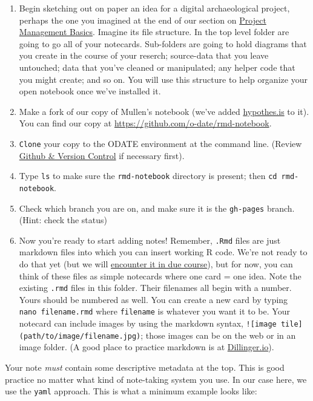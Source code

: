 \documentclass[english,]{book}
\begin{document}
\begin{enumerate}
\def\labelenumi{\alph{enumi}.}
\item
  Begin sketching out on paper an idea for a digital archaeological
  project, perhaps the one you imagined at the end of our section on
  \protect\hyperlink{project-management-basics}{Project Management
  Basics}. Imagine its file structure. In the top level folder are going
  to go all of your notecards. Sub-folders are going to hold diagrams
  that you create in the course of your reserch; source-data that you
  leave untouched; data that you've cleaned or manipulated; any helper
  code that you might create; and so on. You will use this structure to
  help organize your open notebook once we've installed it.
\item
  Make a fork of our copy of Mullen's notebook (we've added
  \href{http://hypothes.is}{hypothes.is} to it). You can find our copy
  at \url{https://github.com/o-date/rmd-notebook}.
\item
  \texttt{Clone} your copy to the ODATE environment at the command line.
  (Review \protect\hyperlink{github-version-control}{Github \& Version
  Control} if necessary first).
\item
  Type \texttt{ls} to make sure the \texttt{rmd-notebook} directory is
  present; then \texttt{cd\ rmd-notebook}.
\item
  Check which branch you are on, and make sure it is the
  \texttt{gh-pages} branch. (Hint: check the status)
\item
  Now you're ready to start adding notes! Remember, \texttt{.Rmd} files
  are just markdown files into which you can insert working R code.
  We're not ready to do that yet (but we will
  \href{Statistical\%20Computing\%20with\%20R\%20and\%20Python\%20Notebooks;\%20Reproducible\%20code}{encounter
  it in due course}), but for now, you can think of these files as
  simple notecards where one card = one idea. Note the existing
  \texttt{.rmd} files in this folder. Their filenames all begin with a
  number. Yours should be numbered as well. You can create a new card by
  typing \texttt{nano\ filename.rmd} where \texttt{filename} is whatever
  you want it to be. Your notecard can include images by using the
  markdown syntax,
  \texttt{!{[}image\ tile{]}(path/to/image/filename.jpg)}; those images
  can be on the web or in an image folder. (A good place to practice
  markdown is at \href{http://dillinger.io}{Dillinger.io}).
\end{enumerate}

Your note \emph{must} contain some descriptive metadata at the top. This
is good practice no matter what kind of note-taking system you use. In
our case here, we use the \texttt{yaml} approach. This is what a minimum
example looks like:
\end{document}
